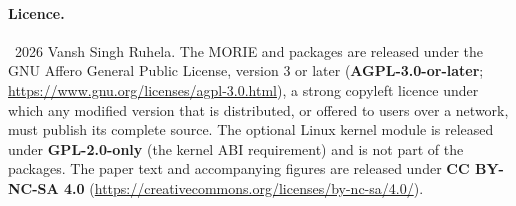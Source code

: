 \documentclass[article,shortnames,nojss]{jss}
\newcommand{\1}{\mathbbm{1}}
\theoremstyle{plain}
\theoremstyle{definition}
\begin{document}
\paragraph{Licence.}
\textcopyright\ 2026 Vansh Singh Ruhela.  The MORIE  and  packages are released under the GNU Affero General Public License, version 3 or later (\textbf{AGPL-3.0-or-later}; \url{https://www.gnu.org/licenses/agpl-3.0.html}), a strong copyleft licence under which any modified version that is distributed, or offered to users over a network, must publish its complete source.  The optional Linux kernel module is released under \textbf{GPL-2.0-only} (the kernel ABI requirement) and is not part of the packages.  The paper text and accompanying figures are released under \textbf{CC BY-NC-SA 4.0} (\url{https://creativecommons.org/licenses/by-nc-sa/4.0/}).


\end{document}
